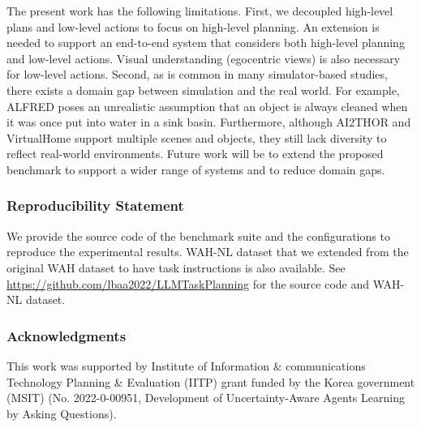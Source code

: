 The present work has the following limitations. First, we decoupled high-level plans and low-level actions to focus on high-level planning. An extension is needed to support an end-to-end system that considers both high-level planning and low-level actions. Visual understanding (egocentric views) is also necessary for low-level actions.
Second, as is common in many simulator-based studies, there exists a domain gap between simulation and the real world. For example, ALFRED poses an unrealistic assumption that an object is always cleaned when it was once put into water in a sink basin. Furthermore, although AI2THOR and VirtualHome support multiple scenes and objects, they still lack diversity to reflect real-world environments. 
Future work will be to extend the proposed benchmark to support a wider range of systems and to reduce domain gaps.

\subsubsection*{Reproducibility Statement}
We provide the source code of the benchmark suite and the configurations to reproduce the experimental results. WAH-NL dataset that we extended from the original WAH dataset to have task instructions is also available. See \url{https://github.com/lbaa2022/LLMTaskPlanning} for the source code and WAH-NL dataset.

\subsubsection*{Acknowledgments}
This work was supported by Institute of Information \& communications Technology Planning \& Evaluation (IITP) grant funded by the Korea government (MSIT) (No. 2022-0-00951, Development of Uncertainty-Aware Agents Learning by Asking Questions).

